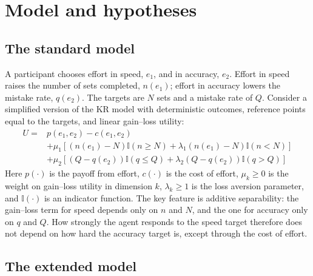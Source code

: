\documentclass[12pt, letterpaper]{article}
\begin{document}
\section{Model and hypotheses}\label{sec:model}

\subsection{The standard model}

A participant chooses effort in speed, $e_1$, and in accuracy, $e_2$. Effort in speed raises the number of sets completed, $n(e_1)$; effort in accuracy lowers the mistake rate, $q(e_2)$. The targets are $N$ sets and a mistake rate of $Q$. Consider a simplified version of the KR model with deterministic outcomes, reference points equal to the targets, and linear gain--loss utility:
\[
\begin{aligned}
U = {} & p(e_1, e_2) - c(e_1, e_2) \\
& + \mu_1[(n(e_1)-N)\mathbb{I}(n \geq N) + \lambda_1(n(e_1)-N)\mathbb{I}(n<N)] \\
& + \mu_2[(Q-q(e_2))\mathbb{I}(q \leq Q) + \lambda_2(Q-q(e_2))\mathbb{I}(q>Q)]
\end{aligned}
\]
Here $p(\cdot)$ is the payoff from effort, $c(\cdot)$ is the cost of effort, $\mu_k \geq 0$ is the weight on gain--loss utility in dimension $k$, $\lambda_k \geq 1$ is the loss aversion parameter, and $\mathbb{I}(\cdot)$ is an indicator function. The key feature is additive separability: the gain--loss term for speed depends only on $n$ and $N$, and the one for accuracy only on $q$ and $Q$. How strongly the agent responds to the speed target therefore does not depend on how hard the accuracy target is, except through the cost of effort.

\subsection{The extended model}
\end{document}
